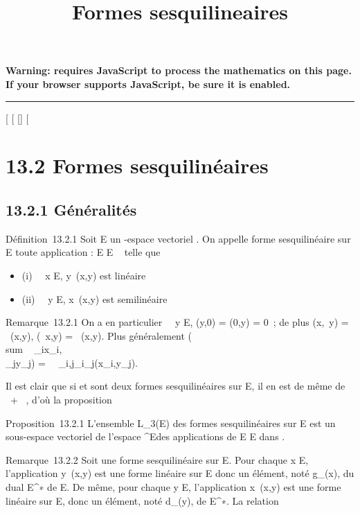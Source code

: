 \documentclass[]{article}
\title{Formes sesquilineaires}
\author{}
\date{}
\begin{document}
\maketitle

\textbf{Warning: 
requires JavaScript to process the mathematics on this page.\\ If your
browser supports JavaScript, be sure it is enabled.}

\begin{center}\rule{3in}{0.4pt}\end{center}

[
[
[]
[

\section{13.2 Formes sesquilinéaires}

\subsection{13.2.1 Généralités}

Définition~13.2.1 Soit E un -espace vectoriel . On appelle forme
sesquilinéaire sur E toute application \phi : E \times E \rightarrow~  telle que

\begin{itemize}
\itemsep1pt\parskip0pt
\item
  (i) \forall~~x \in E,
  y\mapsto~\phi(x,y) est linéaire
\item
  (ii) \forall~~y \in E,
  x\mapsto~\phi(x,y) est semilinéaire
\end{itemize}

Remarque~13.2.1 On a en particulier \forall~~y \in E,
\phi(y,0) = \phi(0,y) = 0~; de plus \phi(x,\lambda~y) = \lambda~\phi(x,y), \phi(\lambda~x,y) =
\overline\lambda~\phi(x,y). Plus généralement
\phi(\\sum ~
\lambda_ix_i,\\\sum
 \mu_jy_j) =\
\sum ~
_i,j\overline\lambda_i\mu_j\phi(x_i,y_j).

Il est clair que si \phi et \psi sont deux formes sesquilinéaires sur E, il en
est de même de \alpha~\phi + \beta~\psi, d'où la proposition

Proposition~13.2.1 L'ensemble L_3(E) des formes
sesquilinéaires sur E est un sous-espace vectoriel de l'espace
^E\timesE des applications de E \times E dans .

Remarque~13.2.2 Soit \phi une forme sesquilinéaire sur E. Pour chaque x \in
E, l'application y\mapsto~\phi(x,y) est une forme
linéaire sur E donc un élément, noté g_\phi(x), du dual
E^∗ de E. De même, pour chaque y \in E, l'application
x\mapsto~\overline\phi(x,y) est une
forme linéaire sur E, donc un élément, noté d_\phi(y), de
E^∗. La relation
\end{document}
